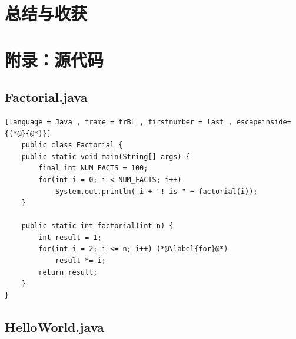 \documentclass[UTF8]{ctexart}
\begin{document}
\section{总结与收获}
\newpage
\appendix
\section{附录：源代码}
\subsection{Factorial.java}
\begin{lstlisting}[language = Java , frame = trBL , firstnumber = last , escapeinside={(*@}{@*)}]
    public class Factorial {
    public static void main(String[] args) {   
        final int NUM_FACTS = 100;
        for(int i = 0; i < NUM_FACTS; i++)
            System.out.println( i + "! is " + factorial(i));
    }

    public static int factorial(int n) {
        int result = 1;
        for(int i = 2; i <= n; i++) (*@\label{for}@*)
            result *= i;
        return result;
    }
}
\end{lstlisting}
\subsection{HelloWorld.java}

\end{document}
